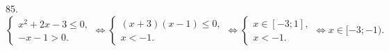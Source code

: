 85. $\begin{cases} x^2+2x-3\leqslant0,\\ -x-1>0.\end{cases} \Leftrightarrow\begin{cases} (x+3)(x-1)\leqslant0,\\ x<-1.\end{cases}
\Leftrightarrow\begin{cases} x\in[-3;1],\\ x<-1.\end{cases}\Leftrightarrow x\in[-3;-1).$\\
